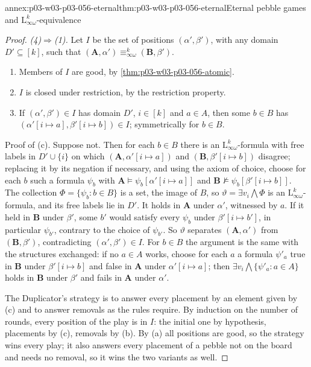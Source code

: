 \begin{annexitem}{annex:p03-w03-p03-056-eternal}{thm:p03-w03-p03-056-eternal}{Eternal pebble games and \(\mathrm{L}^k_{\infty\omega}\)-equivalence}
\begin{proof}
\emph{(4)\(\Rightarrow\)(1).} Let \(I\) be the set of positions
\((\alpha',\beta')\), with any domain \(D'\subseteq[k]\), such that
\((\mathbf A,\alpha')\equiv^k_{\infty\omega}(\mathbf B,\beta')\).
\begin{enumerate}
\item[(a)] Members of \(I\) are good, by \cref{thm:p03-w03-p03-056-atomic}.
\item[(b)] \(I\) is closed under restriction, by the restriction property.
\item[(c)] If \((\alpha',\beta')\in I\) has domain \(D'\), \(i\in[k]\) and
      \(a\in A\), then some \(b\in B\) has
      \((\alpha'[i\mapsto a],\beta'[i\mapsto b])\in I\); symmetrically for
      \(b\in B\).
\end{enumerate}
Proof of (c). Suppose not. Then for each \(b\in B\) there is an
\(\mathrm{L}^k_{\infty\omega}\)-formula with free labels in \(D'\cup\{i\}\)
on which \((\mathbf A,\alpha'[i\mapsto a])\) and
\((\mathbf B,\beta'[i\mapsto b])\) disagree; replacing it by its negation if
necessary, and using the axiom of choice, choose for each \(b\) such a
formula \(\psi_b\) with \(\mathbf A\models\psi_b[\alpha'[i\mapsto a]]\) and
\(\mathbf B\not\models\psi_b[\beta'[i\mapsto b]]\). The collection
\(\Phi=\{\psi_b:b\in B\}\) is a set, the image of \(B\), so
\(\vartheta=\exists v_i\bigwedge\Phi\) is an
\(\mathrm{L}^k_{\infty\omega}\)-formula, and its free labels lie in \(D'\).
It holds in \(\mathbf A\) under \(\alpha'\), witnessed by \(a\). If it held in
\(\mathbf B\) under \(\beta'\), some \(b'\) would satisfy every \(\psi_b\)
under \(\beta'[i\mapsto b']\), in particular \(\psi_{b'}\), contrary to the
choice of \(\psi_{b'}\). So \(\vartheta\) separates \((\mathbf A,\alpha')\)
from \((\mathbf B,\beta')\), contradicting \((\alpha',\beta')\in I\). For
\(b\in B\) the argument is the same with the structures exchanged: if no
\(a\in A\) works, choose for each \(a\) a formula \(\psi'_a\) true in
\(\mathbf B\) under \(\beta'[i\mapsto b]\) and false in \(\mathbf A\) under
\(\alpha'[i\mapsto a]\); then \(\exists v_i\bigwedge\{\psi'_a:a\in A\}\)
holds in \(\mathbf B\) under \(\beta'\) and fails in \(\mathbf A\) under
\(\alpha'\).

The Duplicator's strategy is to answer every placement by an element given
by (c) and to answer removals as the rules require. By induction on the
number of rounds, every position of the play is in \(I\): the initial one by
hypothesis, placements by (c), removals by (b). By (a) all positions are good,
so the strategy wins every play; it also answers every placement of a
pebble not on the board and needs no removal, so it wins the two variants as
well.


\end{proof}
\end{annexitem}
